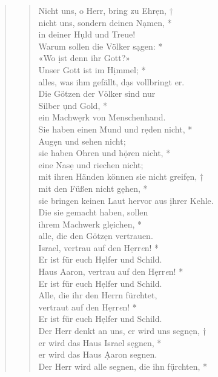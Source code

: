 \begin{quote}
\begin{verse}
Nicht uns, o Herr, bring zu Ehr\d en, †\\
nicht uns, sondern deinen N\d amen, *\\  
in deiner H\d uld und Treue! \\ 
\vin Warum sollen die Völker s\d agen: *\\ 
\vin «Wo \d ist denn ihr Gott?» \\
Unser Gott ist im H\d immel; *\\ 
alles, was ihm gefällt, d\d as vollbringt er.\\ 
\vin Die Götzen der Völker sind nur \\ 
\vin Silber \d und Gold, *\\ 
\vin ein Machw\d erk von Menschenhand.\\ 
Sie haben einen Mund und r\d eden nicht, *\\ 
Aug\d en und sehen nicht;\\ 
\vin sie haben Ohren und h\d ören nicht, *\\ 
\vin eine Nas\d e und riechen nicht;\\
mit ihren Händen können sie nicht greif\d en, †\\
mit den Füßen nicht g\d ehen, *\\  
sie bringen keinen Laut hervor aus \d ihrer Kehle.\\ 
\vin Die sie gemacht haben, sollen\\ 
\vin ihrem Machwerk gl\d eichen, *\\ 
\vin alle, die den Götz\d en vertrauen.\\ 
Israel, vertrau auf den H\d err\textit{e}n! *\\ 
Er ist für euch H\d elfer und Schild.\\ 
\vin Haus Aaron, vertrau auf den H\d err\textit{e}n! *\\ 
\vin Er ist für euch H\d elfer und Schild.\\ 
Alle, die ihr den Herrn fürchtet, \\
vertraut auf den H\d err\textit{e}n! *\\ 
Er ist für euch H\d elfer und Schild.\\ 
\vin Der Herr denkt an uns, er wird uns segn\d en, †\\ 
\vin er wird das Haus Israel s\d egnen, *\\ 
\vin  er wird das Haus \d Aaron segnen.\\ 
Der Herr wird alle segnen, die ihn f\d ürchten, *\\ 

\end{verse}
\end{quote}
